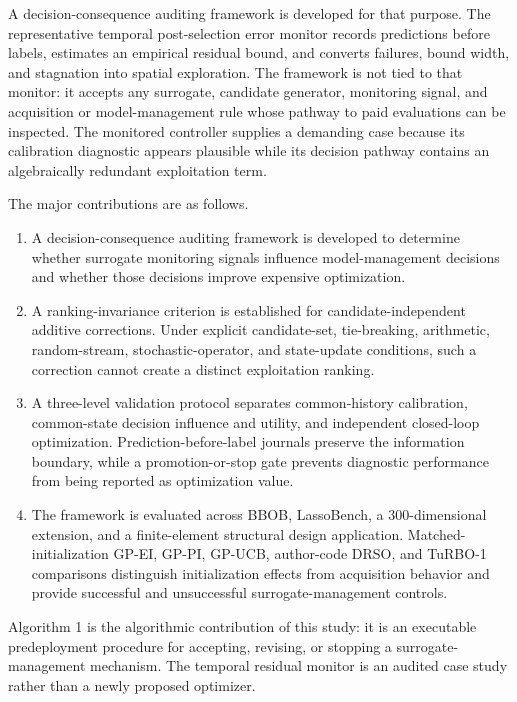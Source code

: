 \documentclass[cmc,article,submit,moreauthors,pdftex]{Definitions/tsp}
\providecommand{\tightlist}{\setlength{\itemsep}{0pt}\setlength{\parskip}{0pt}}
\begin{document}
A decision-consequence auditing framework is developed for that purpose. The representative temporal post-selection error monitor records predictions before labels, estimates an empirical residual bound, and converts failures, bound width, and stagnation into spatial exploration. The framework is not tied to that monitor: it accepts any surrogate, candidate generator, monitoring signal, and acquisition or model-management rule whose pathway to paid evaluations can be inspected. The monitored controller supplies a demanding case because its calibration diagnostic appears plausible while its decision pathway contains an algebraically redundant exploitation term.

The major contributions are as follows.

\begin{enumerate}
\def\labelenumi{\arabic{enumi}.}
\tightlist
\item
  A decision-consequence auditing framework is developed to determine whether surrogate monitoring signals influence model-management decisions and whether those decisions improve expensive optimization.
\item
  A ranking-invariance criterion is established for candidate-independent additive corrections. Under explicit candidate-set, tie-breaking, arithmetic, random-stream, stochastic-operator, and state-update conditions, such a correction cannot create a distinct exploitation ranking.
\item
  A three-level validation protocol separates common-history calibration, common-state decision influence and utility, and independent closed-loop optimization. Prediction-before-label journals preserve the information boundary, while a promotion-or-stop gate prevents diagnostic performance from being reported as optimization value.
\item
  The framework is evaluated across BBOB, LassoBench, a 300-dimensional extension, and a finite-element structural design application. Matched-initialization GP-EI, GP-PI, GP-UCB, author-code DRSO, and TuRBO-1 comparisons distinguish initialization effects from acquisition behavior and provide successful and unsuccessful surrogate-management controls.
\end{enumerate}

Algorithm 1 is the algorithmic contribution of this study: it is an executable predeployment procedure for accepting, revising, or stopping a surrogate-management mechanism. The temporal residual monitor is an audited case study rather than a newly proposed optimizer.
\end{document}
